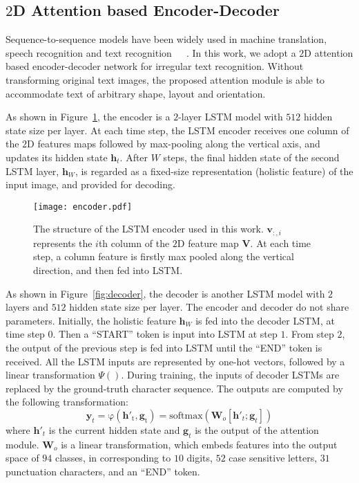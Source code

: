 \documentclass[letterpaper]{article} \usepackage{aaai19}  \usepackage{times}  \usepackage{helvet}  \usepackage{courier}  \usepackage{url}  \usepackage{graphicx}  \usepackage{amsmath}
\begin{document}
\subsection{$2$D Attention based Encoder-Decoder}

Sequence-to-sequence models have been widely used in machine translation, speech recognition and text recognition~\cite{DBLP:conf/nips/Sutskever14}~\cite{Attention15}~\cite{Cheng2017}.
In this work, we adopt a $2$D attention based encoder-decoder network for irregular text recognition.
Without transforming original text images, the proposed attention module is able to accommodate text of arbitrary shape, layout and orientation.


As shown in Figure~\ref{fig:encoder},
the encoder is a $2$-layer LSTM model with $512$ hidden state size per layer.
At each time step, the LSTM encoder receives one column of the $2$D features maps followed by max-pooling along the vertical axis,
and updates its hidden state $\mathbf{h}_t$.
After $W$ steps, the final hidden state of the second LSTM layer, $\mathbf{h}_{W}$, is regarded as a fixed-size representation (holistic feature) of the input image,
and provided for decoding.

\begin{figure}[t]
	\begin{center}
		\texttt{[image: encoder.pdf]}
	\end{center}
	\caption{The structure of the LSTM encoder used in this work. $\mathbf{v}_{:,i}$ represents the $i$th column of the $2$D feature map $\mathbf{V}$.
		At each time step, a column feature is firstly max pooled along the vertical direction, and then fed into LSTM.
	}
	\label{fig:encoder}

\end{figure}

As shown in Figure~\ref{fig:decoder},
the decoder is another LSTM model with $2$ layers and  $512$ hidden state size per layer.
The encoder and decoder do not share parameters.
Initially, the holistic feature $\mathbf{h}_{W}$ is fed into the decoder LSTM, at time step $0$.
Then a ``START'' token is input into LSTM at step $1$.
From step $2$,
the output of the previous step is fed into LSTM until the ``END'' token is received.
All the LSTM inputs are represented by one-hot vectors,
followed by a linear transformation $\Psi()$.
During training, the inputs of decoder LSTMs are replaced by the ground-truth character sequence.
The outputs are computed by the following transformation:
\begin{equation}
\mathbf{y}_t = \mathrm{ \varphi( \mathbf{h}'_t, \mathbf{g}_t   )} = \mathrm{softmax}(\mathbf{W}_o  [ \mathbf{h}'_t; \mathbf{g}_t ] )
\end{equation}
where $\mathbf{h}'_t$ is the current hidden state and $\mathbf{g}_t$ is the output of the attention module.
$\mathbf{W}_o $ is a linear transformation, which embeds features into the output space of $94$ classes, in corresponding to $10$ digits, $52$ case sensitive letters, $31$ punctuation characters, and an ``END'' token.
\end{document}
